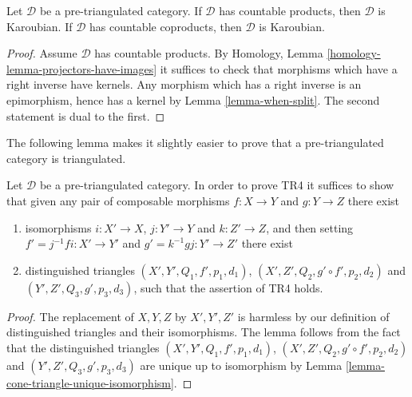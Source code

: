 \begin{lemma}
\label{lemma-projectors-have-images-triangulated}
Let $\mathcal{D}$ be a pre-triangulated category.
If $\mathcal{D}$ has countable products, then $\mathcal{D}$
is Karoubian.
If $\mathcal{D}$ has countable coproducts, then $\mathcal{D}$
is Karoubian.
\end{lemma}

\begin{proof}
Assume $\mathcal{D}$ has countable products. By
Homology, Lemma \ref{homology-lemma-projectors-have-images}
it suffices to check that morphisms which have a right inverse have kernels.
Any morphism which has a right inverse is an epimorphism, hence
has a kernel by
Lemma \ref{lemma-when-split}.
The second statement is dual to the first.
\end{proof}

\noindent
The following lemma makes it slightly easier to prove that a
pre-triangulated category is triangulated.

\begin{lemma}
\label{lemma-easier-axiom-four}
Let $\mathcal{D}$ be a pre-triangulated category.
In order to prove TR4 it suffices to show that given
any pair of composable morphisms
$f : X \to Y$ and $g : Y \to Z$ there exist
\begin{enumerate}
\item isomorphisms $i : X' \to X$, $j : Y' \to Y$ and
$k : Z' \to Z$, and then setting $f' = j^{-1}fi : X' \to Y'$ and
$g' = k^{-1}gj : Y' \to Z'$ there exist
\item distinguished triangles
$(X', Y', Q_1, f', p_1, d_1)$,
$(X', Z', Q_2, g' \circ f', p_2, d_2)$
and
$(Y', Z', Q_3, g', p_3, d_3)$,
such that the assertion of TR4 holds.
\end{enumerate}
\end{lemma}

\begin{proof}
The replacement of $X, Y, Z$ by $X', Y', Z'$ is harmless by our
definition of distinguished triangles and their isomorphisms.
The lemma follows from the fact that the distinguished triangles
$(X', Y', Q_1, f', p_1, d_1)$,
$(X', Z', Q_2, g' \circ f', p_2, d_2)$
and
$(Y', Z', Q_3, g', p_3, d_3)$
are unique up to isomorphism by
Lemma \ref{lemma-cone-triangle-unique-isomorphism}.
\end{proof}


